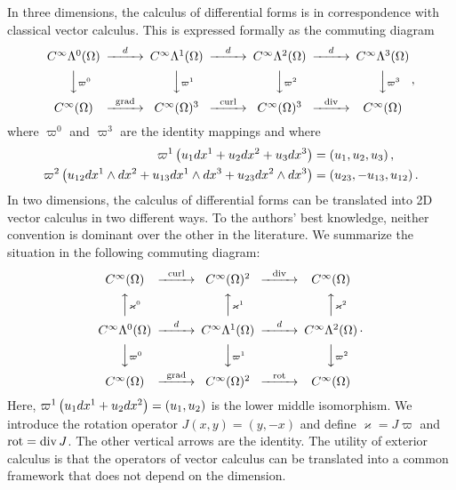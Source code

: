 \documentclass[10pt,a4paper]{article}
\begin{document}
\begin{remark}
    In three dimensions, 
    the calculus of differential forms is in correspondence with classical vector calculus. 
    This is expressed formally as the commuting diagram 
    \begin{gather*}
    \begin{CD}
        C^\infty\Alt^0(\Omega) @>{\cartan}>> C^\infty\Alt^1(\Omega) @>{\cartan}>> C^\infty\Alt^2(\Omega) @>{\cartan}>> C^\infty\Alt^3(\Omega) 
        \\
        @VV{\varpi^{0}}V 
        @VV{\varpi^{1}}V 
        @VV{\varpi^{2}}V 
        @VV{\varpi^{3}}V 
        \\
        C^\infty(\Omega) @>{\grad}>> C^\infty(\Omega)^{3} @>{\curl}>> C^\infty(\Omega)^{3} @>{\divergence}>> C^\infty(\Omega)
    \end{CD}
    \, ,
    \end{gather*}
    where $\varpi^{0}$ and $\varpi^{3}$ are the identity mappings and where 
    \begin{align*}
     \varpi^{1}\left( u_1 dx^{1} + u_2 dx^{2} + u_3 dx^{3} \right) 
     &= 
     \left( u_1, u_2, u_3 \right), 
     \\
     \varpi^{2}\left( u_{12} dx^{1} \wedge dx^{2} + u_{13} dx^{1} \wedge dx^{3} + u_{23} dx^{2} \wedge dx^{3} \right) 
     &= 
     \left( u_{23}, - u_{13}, u_{12} \right).   
    \end{align*}
    In two dimensions, 
    the calculus of differential forms can be translated into 2D vector calculus in two different ways. 
    To the authors' best knowledge, neither convention is dominant over the other in the literature.
    We summarize the situation in the following commuting diagram: 
    \begin{gather*} 
    \begin{CD}
        C^\infty(\Omega) @>{\curl}>> C^\infty(\Omega)^{2} @>{\divergence}>> C^\infty(\Omega)
        \\
        @AA{\varkappa^{0}}A 
        @AA{\varkappa^{1}}A 
        @AA{\varkappa^{2}}A 
        \\
        C^\infty\Alt^0(\Omega) @>{\cartan}>> C^\infty\Alt^1(\Omega) @>{\cartan}>> C^\infty\Alt^2(\Omega) 
        \\
        @VV{\varpi^{0}}V 
        @VV{\varpi^{1}}V 
        @VV{\varpi^{2}}V 
        \\
        C^\infty(\Omega) @>{\grad}>> C^\infty(\Omega)^{2} @>{\rot}>> C^\infty(\Omega)
    \end{CD}
    \,.
    \end{gather*}
    Here, $\varpi^{1}\left( u_1 dx^{1} + u_2 dx^{2} \right) = \left( u_1, u_2 \right)$ is the lower middle isomorphism. We introduce the rotation operator $J(x,y) = (y,-x)$ and define $\varkappa = J \varpi$ and $\operatorname{rot} = \operatorname{div} J$.
    The other vertical arrows are the identity. 
    The utility of exterior calculus is that the operators of vector calculus can be translated into a common framework that does not depend on the dimension.
\end{remark}
\end{document}

